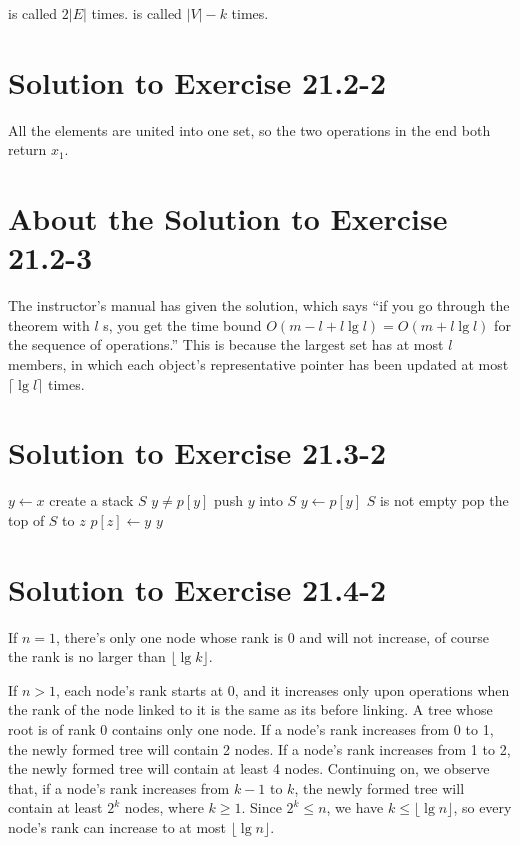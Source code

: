 \documentclass[a4paper, fleqn]{article}
\begin{document}
 is called $2|E|$ times.  is called $|V| -
k$ times.






\section*{Solution to Exercise 21.2-2}

All the elements are united into one set, so the two 
operations in the end both return $x_1$.





\section*{About the Solution to Exercise 21.2-3}

The instructor's manual has given the solution, which says ``if you go
through the theorem with $l$ s, you get the time bound
$O(m - l + l \lg l) = O(m + l \lg l)$ for the sequence of
operations.'' This is because the largest set has at most $l$ members,
in which each object's representative pointer has been updated at most
$\lceil \lg l \rceil$ times.






\section*{Solution to Exercise 21.3-2}

\begin{codebox}
\li $y \gets x$
\li create a stack $S$
\li \While $y \neq p[y]$
\li   \Do
        push $y$ into $S$
\li     $y \gets p[y]$
      \End
\li \While $S$ is not empty
\li   \Do
        pop the top of $S$ to $z$
\li     $p[z] \gets y$
      \End
\li \Return $y$
\end{codebox}






\section*{Solution to Exercise 21.4-2}

If $n = 1$, there's only one node whose rank is 0 and will not
increase, of course the rank is no larger than $\lfloor\lg k\rfloor$.

If $n > 1$, each node's rank starts at 0, and it increases only upon
 operations when the rank of the node linked to it is the
same as its before linking. A tree whose root is of rank 0 contains
only one node.  If a node's rank increases from 0 to 1, the newly
formed tree will contain 2 nodes. If a node's rank increases from 1 to
2, the newly formed tree will contain at least 4 nodes. Continuing on,
we observe that, if a node's rank increases from $k - 1$ to $k$, the
newly formed tree will contain at least $2^k$ nodes, where $k \geq 1$.
Since $2^k \leq n$, we have $k \leq \lfloor\lg n\rfloor$, so every
node's rank can increase to at most $\lfloor\lg n\rfloor$.
\end{document}

